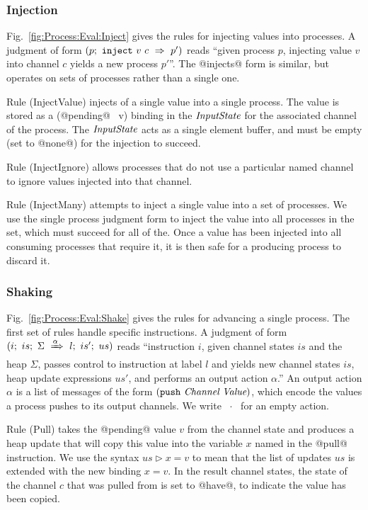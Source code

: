 \eject{}
\subsubsection{Injection}
Fig.~\ref{fig:Process:Eval:Inject} gives the rules for injecting values into processes. A judgment of form $(p;~\texttt{inject}~v~c~\Rightarrow~p')$ reads ``given process $p$, injecting value $v$ into channel $c$ yields a new process $p'$''. The @injects@ form is similar, but operates on sets of processes rather than a single one.

Rule (InjectValue) injects of a single value into a single process. The value is stored as a (@pending@~ v) binding in the $\textit{InputState}$ for the associated channel of the process. The $\textit{InputState}$ acts as a single element buffer, and must be empty (set to @none@) for the injection to succeed.

Rule (InjectIgnore) allows processes that do not use a particular named channel to ignore values injected into that channel.

Rule (InjectMany) attempts to inject a single value into a set of processes. We use the single process judgment form to inject the value into all processes in the set, which must succeed for all of the. Once a value has been injected into all consuming processes that require it, it is then safe for a producing process to discard it.


\subsubsection{Shaking}
Fig.~\ref{fig:Process:Eval:Shake} gives the rules for advancing a single process. The first set of rules handle specific instructions. A judgment of form $(i;~is;~\Sigma~\xRightarrow{\alpha}~l;~is';~us)$ reads ``instruction $i$, given channel states $is$ and the heap $\Sigma$, passes control to instruction at label $l$ and yields new channel states $is$, heap update expressions $us'$, and performs an output action $\alpha$.'' An output action $\alpha$ is a list of messages of the form $(\texttt{push}~\textit{Channel}~\textit{Value})$, which encode the values a process pushes to its output channels. We write ~$\cdot$~ for an empty action. 

\eject{}
Rule (Pull) takes the @pending@ value $v$ from the channel state and produces a heap update that will copy this value into the variable $x$ named in the @pull@ instruction. We use the syntax $us \rhd x=v$ to mean that the list of updates $us$ is extended with the new binding $x=v$. In the result channel states, the state of the channel $c$ that was pulled from is set to @have@, to indicate the value has been copied.

